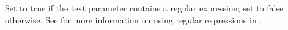     Set to true if the text parameter contains a regular
    expression; set to false otherwise. See 
    for more information on using regular expressions in \app{}.